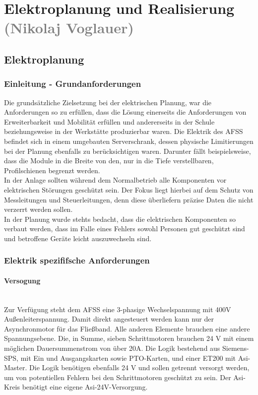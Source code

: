 \section{Elektroplanung und Realisierung \textcolor{gray}{(Nikolaj Voglauer)}}

\subsection{Elektroplanung}
\label{sec:Elektroplanung}

\subsubsection{Einleitung - Grundanforderungen}
    Die grundsätzliche Zielsetzung bei der elektrischen Planung, war die Anforderungen so zu erfüllen, dass die Lösung einerseits die Anforderungen von Erweiterbarkeit und Mobilität erfüllen und andererseits in der Schule beziehungsweise in der Werkstätte produzierbar waren. Die Elektrik des AFSS befindet sich in einem umgebauten Serverschrank, dessen physische Limitierungen bei der Planung ebenfalls zu berücksichtigen waren. Darunter fällt beispielsweise, dass die Module in die Breite von den, nur in die Tiefe verstellbaren, Profilschienen begrenzt werden.\\
    In der Anlage sollten während dem Normalbetrieb alle Komponenten vor elektrischen Störungen geschützt sein. Der Fokus liegt hierbei auf dem Schutz von Messleitungen und Steuerleitungen, denn diese überliefern präzise Daten die nicht verzerrt werden sollen.\\ 
    In der Planung wurde stehts bedacht, dass die elektrischen Komponenten so verbaut werden, dass im Falle eines Fehlers sowohl Personen gut geschützt sind und betroffene Geräte leicht auszuwechseln sind.\\

\subsubsection{Elektrik spezififsche Anforderungen}
\label{sec:Elektrik spezififsche Anforderungen}

    \paragraph{Versogung}\mbox{}\\
    Zur Verfügung steht dem AFSS eine 3-phasige Wechselspannung mit 400V Außenleiterspannung. Damit direkt angesteuert werden kann nur der Asynchronmotor für das Fließband. Alle anderen Elemente brauchen eine andere Spannungsebene. Die, in Summe, sieben Schrittmotoren brauchen 24 V mit einem möglichen Dauersummenstrom von über 20A. Die Logik bestehend aus Siemens-SPS, mit Ein und Ausgangskarten sowie PTO-Karten, und einer ET200 mit Asi-Master. Die Logik benötigen ebenfalls 24 V und sollen getrennt versorgt werden, um von potentiellen Fehlern bei den Schrittmotoren geschützt zu sein. Der Asi-Kreis benötigt eine eigene Asi-24V-Versorgung.


